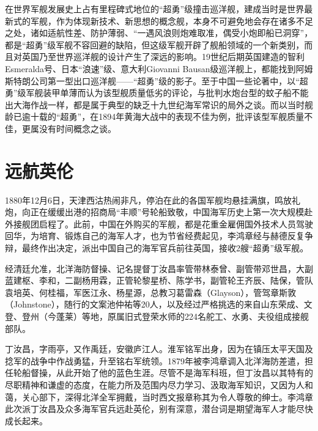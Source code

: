 \documentclass[12pt,UTF8]{ctexbook}
\begin{document}
在世界军舰发展史上占有里程碑式地位的“超勇”级撞击巡洋舰，建成当时是世界最新式的军舰，作为体现新技术、新思想的概念舰，本身不可避免地会存在诸多不足之处，诸如适航性差、防护薄弱、“一遇风浪则炮难取准，偶受小炮即船已洞穿”，都是“超勇”级军舰不容回避的缺陷，但这级军舰开辟了舰船领域的一个新类别，而且对英国乃至世界巡洋舰的设计产生了深远的影响。19世纪后期英国建造的智利Esmeralda号、日本“浪速”级、意大利Giovanni Bausan级巡洋舰上，都能找到阿姆斯特朗公司第一型出口巡洋舰——“超勇”级的影子。至于中国一些论著中，以“超勇”级军舰装甲单薄而认为该型舰质量低劣的评论，与批判水炮台型的蚊子船不能出大海作战一样，都是属于典型的缺乏十九世纪海军常识的局外之谈。而以当时舰龄已逾十载的“超勇”，在1894年黄海大战中的表现不佳为例，批评该型军舰质量不佳，更属没有时间概念之谈。

\section{远航英伦}

1880年12月6日，天津西沽热闹非凡，停泊在此的各国军舰均悬挂满旗，鸣放礼炮，向正在缓缓出港的招商局“丰顺”号轮船致敬，中国海军历史上第一次大规模赴外接舰团启程了。此前，中国在外购买的军舰，都是花重金雇佣国外技术人员驾驶回华，为培育、锻炼自己的海军人才，也为节省经费起见，李鸿章经与赫德反复争辩，最终作出决定，派出中国自己的海军官兵前往英国，接收2艘“超勇”级军舰。

经清廷允准，北洋海防督操、记名提督丁汝昌率管带林泰曾、副管带邓世昌，大副蓝建枢、李和，二副杨用霖，正管轮黎星桥、陈学书，副管轮王齐辰、陆保，管队袁培英、何桂福，军医江永、杨星源，总教习葛雷森（Glayson），管驾章斯敦（Johnstone），随行的文案池仲祐等20人，以及经过严格挑选的来自山东荣成、文登、登州（今蓬莱）等地，原属旧式登荣水师的224名舵工、水勇、夫役组成接舰部队。

丁汝昌，字雨亭，又作禹廷，安徽庐江人。淮军铭军出身，因为在镇压太平天国及捻军的战争中作战勇猛，升至铭右军统领。1879年被李鸿章调入北洋海防差遣，担任轮船督操，从此开始了他的蓝色生涯。尽管不是海军科班，但丁汝昌以其特有的尽职精神和谦虚的态度，在能力所及范围内尽力学习、汲取海军知识，又因为人和蔼，关心部下，深得北洋全军拥戴，当时西文报章称其为令人尊敬的绅士。李鸿章此次派丁汝昌及众多海军官兵远赴英伦，别有深意，潜台词是期望海军人才能尽快成长起来。
\end{document}
